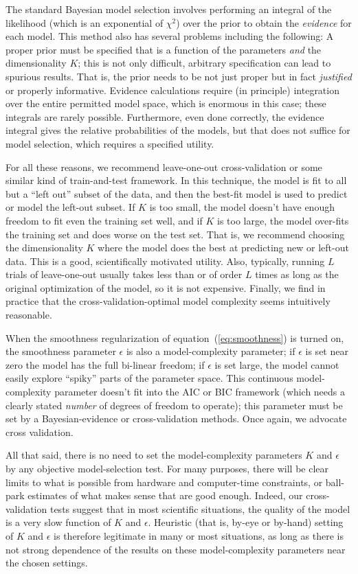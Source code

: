 \documentclass[12pt,preprint]{aastex}
\newcommand{\equationname}{equation}
\begin{document}
The standard Bayesian model selection involves performing an integral
of the likelihood (which is an exponential of $\chi^2$) over the prior
to obtain the \emph{evidence} for each model.  This method also has
several problems including the following: A proper prior must be
specified that is a function of the parameters \emph{and} the
dimensionality $K$; this is not only difficult, arbitrary
specification can lead to spurious results.  That is, the prior needs
to be not just proper but in fact \emph{justified} or properly
informative.  Evidence calculations require (in principle) integration
over the entire permitted model space, which is enormous in this case;
these integrals are rarely possible.  Furthermore, even done
correctly, the evidence integral gives the relative probabilities of
the models, but that does not suffice for model selection, which
requires a specified utility.

For all these reasons, we recommend leave-one-out cross-validation or
some similar kind of train-and-test framework.  In this technique, the
model is fit to all but a ``left out'' subset of the data, and then
the best-fit model is used to predict or model the left-out subset.
If $K$ is too small, the model doesn't have enough freedom to fit even
the training set well, and if $K$ is too large, the model over-fits
the training set and does worse on the test set.  That is, we
recommend choosing the dimensionality $K$ where the model does the
best at predicting new or left-out data.  This is a good,
scientifically motivated utility.  Also, typically, running $L$ trials
of leave-one-out usually takes less than or of order $L$ times as long
as the original optimization of the model, so it is not expensive.
Finally, we find in practice that the cross-validation-optimal model
complexity seems intuitively reasonable.

When the smoothness regularization of
\equationname~(\ref{eq:smoothness}) is turned on, the smoothness
parameter $\epsilon$ is also a model-complexity parameter; if
$\epsilon$ is set near zero the model has the full bi-linear freedom;
if $\epsilon$ is set large, the model cannot easily explore ``spiky''
parts of the parameter space.  This continuous model-complexity
parameter doesn't fit into the AIC or BIC framework (which needs a
clearly stated \emph{number} of degrees of freedom to operate); this
parameter must be set by a Bayesian-evidence or cross-validation
methods.  Once again, we advocate cross validation.

All that said, there is no need to set the model-complexity parameters
$K$ and $\epsilon$ by any objective model-selection test.  For many
purposes, there will be clear limits to what is possible from hardware
and computer-time constraints, or ball-park estimates of what makes
sense that are good enough.  Indeed, our cross-validation tests
suggest that in most scientific situations, the quality of the model
is a very slow function of $K$ and $\epsilon$.  Heuristic (that is,
by-eye or by-hand) setting of
$K$ and $\epsilon$ is therefore legitimate in many or most situations, as long as there is not strong dependence of the results on these model-complexity parameters near the chosen settings.
\end{document}
